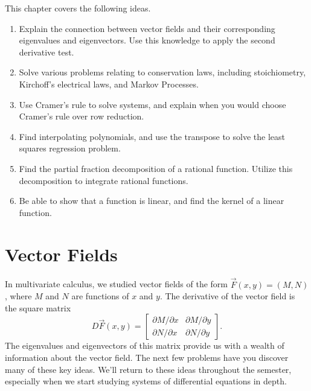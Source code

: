 
\noindent This chapter covers the following ideas.

\begin{enumerate}

\item Explain the connection between vector fields and their corresponding eigenvalues and eigenvectors. Use this knowledge to apply the second derivative test.
\item Solve various problems relating to conservation laws, including stoichiometry, Kirchoff's electrical laws, and Markov Processes.
\item Use Cramer's rule to solve systems, and explain when you would choose Cramer's rule over row reduction.
\item Find interpolating polynomials, and use the transpose to solve the least squares regression problem.
\item Find the partial fraction decomposition of a rational function. Utilize this decomposition to integrate rational functions.
\item Be able to show that a function is linear, and find the kernel of a linear function. 
\end{enumerate}

\section{Vector Fields}
In multivariate calculus, we studied vector fields of the form $\vec F(x,y) = (M,N)$, where $M$ and $N$ are functions of $x$ and $y$. The derivative of the vector field is the square matrix
$$D\vec F(x,y) =
\begin{bmatrix}
\partial M/\partial x &
\partial M/\partial y \\
\partial N/\partial x &
\partial N/\partial y 
\end{bmatrix}.
$$ 
The eigenvalues and eigenvectors of this matrix provide us with a wealth of information about the vector field.  The next few problems have you discover many of these key ideas.  We'll return to these ideas throughout the semester, especially when we start studying systems of differential equations in depth.

